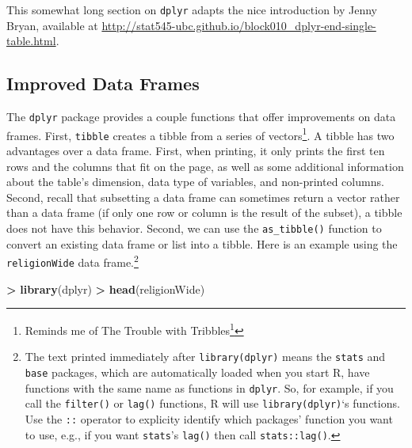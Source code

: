 \documentclass[]{krantz}
\makeatletter
\newenvironment{Shaded}{\begin{snugshade}}{\end{snugshade}}
\newcommand{\KeywordTok}[1]{\textcolor[rgb]{0.27,0.27,0.27}{\textbf{#1}}}
\newcommand{\StringTok}[1]{\textcolor[rgb]{0.5,0.5,0.5}{#1}}
\newcommand{\OperatorTok}[1]{\textcolor[rgb]{0.43,0.43,0.43}{\textbf{#1}}}
\newcommand{\NormalTok}[1]{#1}
\renewcommand{\href}[2]{#2\footnote{\url{#1}}}
\newenvironment{kframe}{%
\medskip{}
\setlength{\fboxsep}{.8em}
 \def\at@end@of@kframe{}%
 \ifinner\ifhmode%
  \def\at@end@of@kframe{\end{minipage}}%
  \begin{minipage}{\columnwidth}%
 \fi\fi%
 \def\FrameCommand##1{\hskip\@totalleftmargin \hskip-\fboxsep
 \colorbox{shadecolor}{##1}\hskip-\fboxsep
     \hskip-\linewidth \hskip-\@totalleftmargin \hskip\columnwidth}%
 \MakeFramed {\advance\hsize-\width
   \@totalleftmargin\z@ \linewidth\hsize
   \@setminipage}}%
 {\par\unskip\endMakeFramed%
 \at@end@of@kframe}
\renewenvironment{Shaded}{\begin{kframe}}{\end{kframe}}
\makeatother
\begin{document}
This somewhat long section on \texttt{dplyr} adapts the nice
introduction by Jenny Bryan, available at
\url{http://stat545-ubc.github.io/block010_dplyr-end-single-table.html}.

\subsection{Improved Data Frames}\label{improved-data-frames}

The \texttt{dplyr} package provides a couple functions that offer
improvements on data frames. First, \texttt{tibble} creates a tibble
from a series of vectors\footnote{Reminds me of
  \href{https://en.wikipedia.org/wiki/The_Trouble_with_Tribbles}{The
  Trouble with Tribbles}}. A tibble has two advantages over a data
frame. First, when printing, it only prints the first ten rows and the
columns that fit on the page, as well as some additional information
about the table's dimension, data type of variables, and non-printed
columns. Second, recall that subsetting a data frame can sometimes
return a vector rather than a data frame (if only one row or column is
the result of the subset), a tibble does not have this behavior. Second,
we can use the \texttt{as\_tibble()} function to convert an existing
data frame or list into a tibble. Here is an example using the
\texttt{religionWide} data frame.\footnote{The text printed immediately
  after \texttt{library(dplyr)} means the \texttt{stats} and
  \texttt{base} packages, which are automatically loaded when you start
  R, have functions with the same name as functions in \texttt{dplyr}.
  So, for example, if you call the \texttt{filter()} or \texttt{lag()}
  functions, R will use \texttt{library(dplyr)}`s functions. Use the
  \texttt{::} operator to explicity identify which packages' function
  you want to use, e.g., if you want \texttt{stats}'s \texttt{lag()}
  then call \texttt{stats::lag()}.}

\begin{Shaded}
\begin{Highlighting}[]
\OperatorTok{>}\StringTok{ }\KeywordTok{library}\NormalTok{(dplyr)}
\OperatorTok{>}\StringTok{ }\KeywordTok{head}\NormalTok{(religionWide)}
\end{Highlighting}
\end{Shaded}
\end{document}
